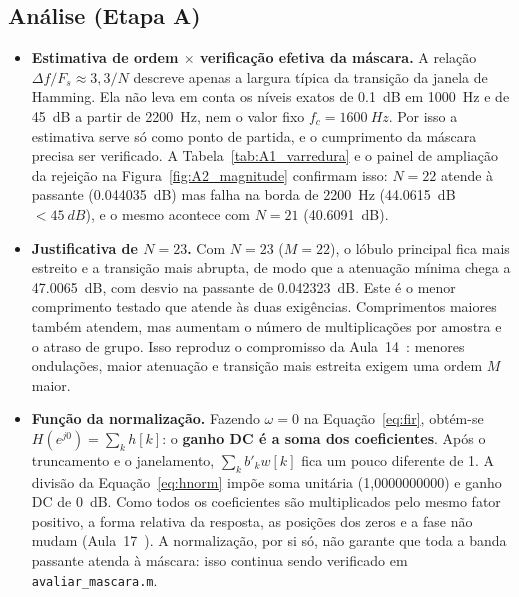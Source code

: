 \documentclass[11pt,a4paper]{article}
\newcommand{\MetricaASomaCoefs}{1{,}0000000000}
\begin{document}
\subsection{Análise (Etapa A)}

\begin{itemize}[leftmargin=1.5em, itemsep=3pt]
    \item \textbf{Estimativa de ordem $\times$ verificação efetiva da máscara.} A relação $\Delta f/F_s \approx 3,3/N$ descreve apenas a largura típica da transição da janela de Hamming. Ela não leva em conta os níveis exatos de \SI{0,1}{dB} em \SI{1000}{Hz} e de \SI{45}{dB} a partir de \SI{2200}{Hz}, nem o valor fixo $f_c = \SI{1600}{Hz}$. Por isso a estimativa serve só como ponto de partida, e o cumprimento da máscara precisa ser verificado. A Tabela~\ref{tab:A1_varredura} e o painel de ampliação da rejeição na Figura~\ref{fig:A2_magnitude} confirmam isso: $N = 22$ atende à passante (\SI{0,044035}{dB}) mas falha na borda de \SI{2200}{Hz} (\SI{44,0615}{dB} $< \SI{45}{dB}$), e o mesmo acontece com $N = 21$ (\SI{40,6091}{dB}).

    \item \textbf{Justificativa de $N = 23$.} Com $N = 23$ ($M = 22$), o lóbulo principal fica mais estreito e a transição mais abrupta, de modo que a atenuação mínima chega a \SI{47,0065}{dB}, com desvio na passante de \SI{0,042323}{dB}. Este é o menor comprimento testado que atende às duas exigências. Comprimentos maiores também atendem, mas aumentam o número de multiplicações por amostra e o atraso de grupo. Isso reproduz o compromisso da Aula~14~\cite{aula14}: menores ondulações, maior atenuação e transição mais estreita exigem uma ordem $M$ maior.

    \item \textbf{Função da normalização.} Fazendo $\omega = 0$ na Equação~\eqref{eq:fir}, obtém-se $H(e^{j0}) = \sum_k h[k]$: o \textbf{ganho DC é a soma dos coeficientes}. Após o truncamento e o janelamento, $\sum_k b'_k w[k]$ fica um pouco diferente de 1. A divisão da Equação~\eqref{eq:hnorm} impõe soma unitária (\MetricaASomaCoefs) e ganho DC de \SI{0}{dB}. Como todos os coeficientes são multiplicados pelo mesmo fator positivo, a forma relativa da resposta, as posições dos zeros e a fase não mudam (Aula~17~\cite{aula17}). A normalização, por si só, não garante que toda a banda passante atenda à máscara: isso continua sendo verificado em \texttt{avaliar\_mascara.m}.


\end{itemize}
\end{document}
